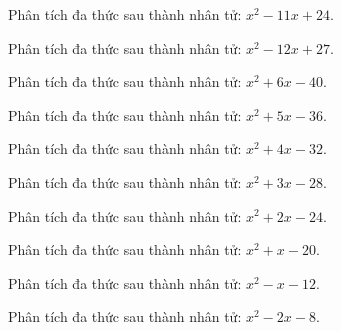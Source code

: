 \begin{bt}
	Phân tích đa thức sau thành nhân tử: $x^2 - 11 x + 24$.
\end{bt}
\begin{bt}
	Phân tích đa thức sau thành nhân tử: $x^2 - 12 x + 27$.
\end{bt}
\begin{bt}
	Phân tích đa thức sau thành nhân tử: $x^2 + 6 x - 40$.
\end{bt}
\begin{bt}
	Phân tích đa thức sau thành nhân tử: $x^2 + 5 x - 36$.
\end{bt}
\begin{bt}
	Phân tích đa thức sau thành nhân tử: $x^2 + 4 x - 32$.
\end{bt}
\begin{bt}
	Phân tích đa thức sau thành nhân tử: $x^2 + 3 x - 28$.
\end{bt}
\begin{bt}
	Phân tích đa thức sau thành nhân tử: $x^2 + 2 x - 24$.
\end{bt}
\begin{bt}
	Phân tích đa thức sau thành nhân tử: $x^2 + x - 20$.
\end{bt}
\begin{bt}
	Phân tích đa thức sau thành nhân tử: $x^2 - x - 12$.
\end{bt}
\begin{bt}
	Phân tích đa thức sau thành nhân tử: $x^2 - 2 x - 8$.
\end{bt}
